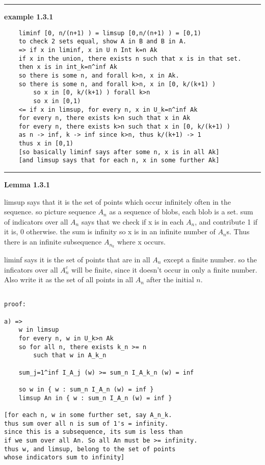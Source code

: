\documentclass{article}
\begin{document}
\begin{flushleft}
\bigbreak
\hrule
\bigbreak
\textbf{example 1.3.1}

\begin{verbatim}
	liminf [0, n/(n+1) ) = limsup [0,n/(n+1) ) = [0,1)
	to check 2 sets equal, show A in B and B in A.
	=> if x in liminf, x in U n Int k=n Ak
    if x in the union, there exists n such that x is in that set. 
    then x is in int_k=n^inf Ak
    so there is some n, and forall k>n, x in Ak.
    so there is some n, and forall k>n, x in [0, k/(k+1) )
        so x in [0, k/(k+1) ) forall k>n
        so x in [0,1)
	<= if x in limsup, for every n, x in U_k=n^inf Ak
    for every n, there exists k>n such that x in Ak
    for every n, there exists k>n such that x in [0, k/(k+1) )
    as n -> inf, k -> inf since k>n, thus k/(k+1) -> 1
    thus x in [0,1)
	[so basically liminf says after some n, x is in all Ak]
	[and limsup says that for each n, x in some further Ak]
\end{verbatim}

\bigbreak
\hrule
\bigbreak
\textbf{Lemma 1.3.1}

\bigbreak

limsup says that it is the set of points which occur infinitely often in the sequence. so picture sequence $A_n$ as a sequence of blobs, each blob is a set. sum of indicators over all $A_n$ says that we check if x is in each $A_n$, and contribute 1 if it is, 0 otherwise. the sum is infinity so x is in an infinite number of $A_n$s. Thus there is an infinite subsequence $A_{n_k}$ where x occurs.

\bigbreak

liminf says it is the set of points that are in all $A_n$ except a finite number. so the inficators over all $A_n^c$ will be finite, since it doesn't occur in only a finite number. Also write it as the set of all points in all $A_n$ after the initial $n$.

\begin{verbatim}
    
proof: 

a) =>   
    w in limsup 
    for every n, w in U_k>n Ak 
    so for all n, there exists k_n >= n 
        such that w in A_k_n
    
    sum_j=1^inf I_A_j (w) >= sum_n I_A_k_n (w) = inf 

    so w in { w : sum_n I_A_n (w) = inf }
    limsup An in { w : sum_n I_A_n (w) = inf }
    
[for each n, w in some further set, say A_n_k.
thus sum over all n is sum of 1's = infinity.
since this is a subsequence, its sum is less than
if we sum over all An. So all An must be >= infinity.
thus w, and limsup, belong to the set of points 
whose indicators sum to infinity]


\end{verbatim}
\end{flushleft}
\end{document}
